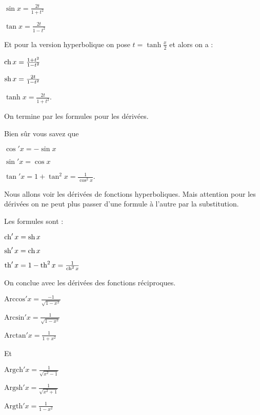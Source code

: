 $\sin x = \frac{2t}{1+t^2}$

$\tan x = \frac{2t}{1-t^2}$


\change

Et pour la version hyperbolique on pose
$t=\tanh \frac{x}{2}$ et alors on a :

$\mathop{\mathrm{ch}}\nolimits x = \frac {1+t^2}{1-t^2}$

$\mathop{\mathrm{sh}}\nolimits x = \frac{2t}{1-t^2}$

$\tanh x = \frac{2t}{1+t^2}$.


\diapo

On termine par les formules pour les dérivées.

Bien sûr vous savez que 

$\cos'x= -\sin x$

$\sin'x=\cos x$

$\tan' x = 1+\tan^2x=\frac{1}{\cos^2x}$.

\change

Nous allons voir les dérivées de fonctions hyperboliques.
Mais attention pour les dérivées on ne peut plus passer
d'une formule à l'autre par la substitution.

\change

Les formules sont :

$\mathop{\mathrm{ch}}\nolimits'x= \mathop{\mathrm{sh}}\nolimits x$

$\mathop{\mathrm{sh}}\nolimits'x=\mathop{\mathrm{ch}}\nolimits x$

$\mathop{\mathrm{th}}\nolimits' x = 1-\mathop{\mathrm{th}}\nolimits^2x=\frac{1}{\mathop{\mathrm{ch}}\nolimits^2x}$

\change

On conclue avec les dérivées des fonctions réciproques.

$\text{Arccos}'x=\frac{-1}{\sqrt{1-x^2}}$

$\text{Arcsin}'x=\frac{1}{\sqrt{1-x^2}}$

$\text{Arctan}'x=\frac{1}{1+x^2}$

\change

Et 

$\text{Argch}'x=\frac{1}{\sqrt{x^2-1}}$


$\text{Argsh}'x=\frac{1}{\sqrt{x^2+1}}$

$\text{Argth}'x=\frac{1}{1-x^2}$


